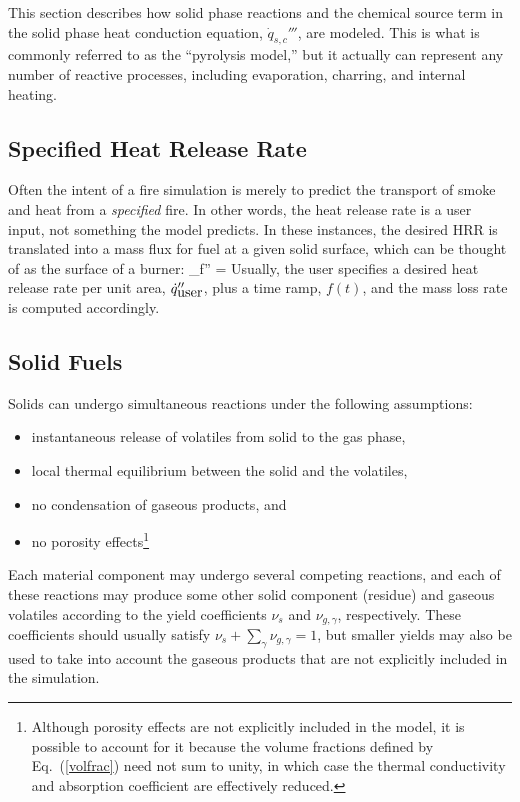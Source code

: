 This section describes how solid phase reactions and the chemical
source term in the solid phase heat conduction equation,
$\dot{q}_{s,c}'''$,  are modeled. This is what is commonly referred to
as the ``pyrolysis model,'' but it actually can represent any number
of reactive processes, including evaporation, charring, and internal
heating.


\subsection{Specified Heat Release Rate}

Often the intent of a fire simulation is merely to predict the
transport of smoke and heat from a {\em specified} fire. In other
words, the heat release rate is a user input, not something the model
predicts. In these instances, the desired HRR is translated into a
mass flux for fuel at a given solid surface, which can be thought of
as the surface of a burner: \be \dm_f'' =  \ee Usually, the user specifies a
desired heat release rate per unit area, $\dot{q}_{\hbox{user}}''$, plus a
time ramp, $f(t)$, and the mass loss rate is computed accordingly.

\subsection{Solid Fuels}

Solids can undergo simultaneous reactions under the following assumptions:
\begin{itemize}
\setlength{\itemsep}{0.0in}
\item instantaneous release of volatiles from solid to the gas phase,
\item local thermal equilibrium between the solid and the volatiles,
\item no condensation of gaseous products, and
\item no porosity effects\footnote{Although porosity effects are not explicitly included in the model, it is possible to account for it
because the volume fractions defined by Eq.~(\ref{volfrac}) need not
sum to unity, in which case the thermal conductivity and absorption
coefficient are effectively reduced.}
\end{itemize}
Each material component may undergo several competing reactions, and
each of these reactions may produce some other solid component
(residue) and gaseous volatiles according to the yield coefficients
$\nu_s$ and $\nu_{g,\gamma}$, respectively.  These coefficients should
usually satisfy $\nu_s + \sum_\gamma \nu_{g,\gamma} = 1$, but smaller yields may
also be used to take into account the gaseous products that are not
explicitly included in the simulation.

